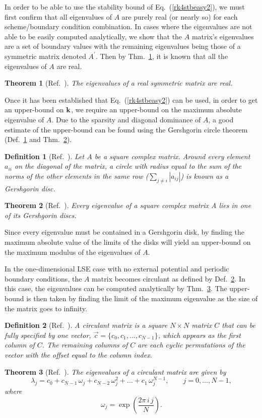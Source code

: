 \documentclass{article}
\newtheorem{thm}{Theorem}
\newtheorem{deff}{Definition}
\begin{document}
In order to be able to use the stability bound of Eq.~(\ref{rk4stbeasy2}), we must first confirm that all eigenvalues of $A$ are purely real (or nearly so) for each scheme/boundary condition combination.  In cases where the eigenvalues are not able to be easily computed analytically, we show that the $A$ matrix's eigenvalues are a set of boundary values with the remaining eigenvalues being those of a symmetric matrix denoted $A^{\prime}$.  Then by  Thm.~\ref{t:real}, it is known that all the eigenvalues of $A$ are real.
\begin{thm}[Ref.~\cite{MATRIX_OP_BOOK}]
\label{t:real}
The eigenvalues of a real symmetric matrix are real.
\end{thm}

Once it has been established that Eq.~(\ref{rk4stbeasy2}) can be used, in order to get an upper-bound on ${\bf k}$, we require an upper-bound on the maximum absolute eigenvalue of $A$.  Due to the sparsity and diagonal dominance of $A$, a good estimate of the upper-bound can be found using the Gershgorin circle theorem (Def.~\ref{d:gersh} and Thm.~\ref{t:gersh}).
\begin{deff}[Ref.~\cite{MATRIX_BOOK}]
\label{d:gersh}
Let $A$ be a square complex matrix. Around every element $a_{ii}$ on the diagonal of the matrix, a circle with radius equal to the sum of the norms of the other elements in the same row ($\sum_{j\neq i}|a_{ij}|$) is known as a \emph{Gershgorin disc}.
\end{deff}
\begin{thm}[Ref.~\cite{MATRIX_BOOK}]
\label{t:gersh}
Every eigenvalue of a square complex matrix A lies in one of its Gershgorin discs.
\end{thm}
Since every eigenvalue must be contained in a Gershgorin disk, by finding the maximum absolute value of the limits of the disks will yield an upper-bound on the maximum modulus of the eigenvalues of $A$.

In the one-dimensional LSE case with no external potential and periodic boundary conditions, the $A$ matrix becomes circulant as defined by Def.~\ref{d:circ}.  In this case, the eigenvalues can be computed analytically by Thm.~\ref{t:circ}.  The upper-bound is then taken by finding the limit of the maximum eigenvalue as the size of the matrix goes to infinity.
\begin{deff}[Ref.~\cite{STB_circulant}]
\label{d:circ}
A circulant matrix is a square $N\times N$ matrix $C$ that can be fully specified by one vector, $\vec c = \{c_0,c_1,...,c_{N-1}\}$, which appears as the first column of $C$. The remaining columns of $C$ are each cyclic permutations of the vector with the offset equal to the column index.
\end{deff}
\begin{thm}[Ref.~\cite{STB_circulant}]
\label{t:circ}
The eigenvalues of a circulant matrix are given by
\[ \lambda_j = c_0 + c_{N-1}\,\omega_j + c_{N-2}\,\omega_j^2 + ... + c_1\,\omega_j^{N-1}, \qquad j = 0,..., {N-1},
\]
where 
\[
\omega_j = \exp \left(\frac{2\pi\, i\, j}{N}\right).
\]
\end{thm}
\end{document}
